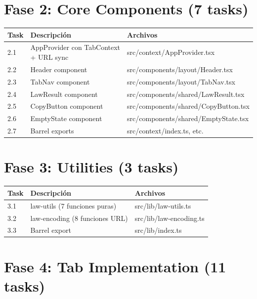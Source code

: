 \documentclass[11pt,a4paper]{report}
\begin{document}
\section{Fase 2: Core Components (7 tasks)}

\begin{table}[h]
\centering
\small
\begin{tabular}{@{}lll@{}}
\toprule
\textbf{Task} & \textbf{Descripción} & \textbf{Archivos} \\
\midrule
2.1 & AppProvider con TabContext + URL sync & src/context/AppProvider.tsx \\
2.2 & Header component & src/components/layout/Header.tsx \\
2.3 & TabNav component & src/components/layout/TabNav.tsx \\
2.4 & LawResult component & src/components/shared/LawResult.tsx \\
2.5 & CopyButton component & src/components/shared/CopyButton.tsx \\
2.6 & EmptyState component & src/components/shared/EmptyState.tsx \\
2.7 & Barrel exports & src/context/index.ts, etc. \\
\bottomrule
\end{tabular}
\end{table}

\section{Fase 3: Utilities (3 tasks)}

\begin{table}[h]
\centering
\small
\begin{tabular}{@{}lll@{}}
\toprule
\textbf{Task} & \textbf{Descripción} & \textbf{Archivos} \\
\midrule
3.1 & law-utils (7 funciones puras) & src/lib/law-utils.ts \\
3.2 & law-encoding (8 funciones URL) & src/lib/law-encoding.ts \\
3.3 & Barrel export & src/lib/index.ts \\
\bottomrule
\end{tabular}
\end{table}

\section{Fase 4: Tab Implementation (11 tasks)}
\end{document}
